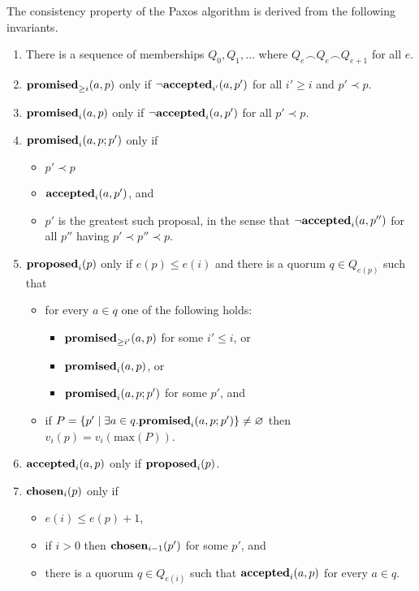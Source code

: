 \documentclass[journal]{IEEEtran}
\begin{document}
The consistency property of the Paxos algorithm is derived from the following
invariants.

\begin{enumerate}

\item\label{paxos-quorums} There is a sequence of memberships $Q_0, Q_1,
\ldots$ where ${Q_e \frown Q_e \frown Q_{e+1}}$ for all $e$.

\item\label{paxos-mprom} $\mathbf{promised}_{\ge i}(a,p)$ only if $\neg\mathbf{accepted}_{i'}(a,p')$ for all
$i' \ge i$ and $p' \prec p$.

\item\label{paxos-fprom} $\mathbf{promised}_{i}(a,p)$ only if $\neg\mathbf{accepted}_{i}(a,p')$ for all
$p' \prec p$.

\item\label{paxos-bprom} $\mathbf{promised}_{i}(a,p;p')$ only if \begin{itemize} \item
$p' \prec p$ \item $\mathbf{accepted}_{i}(a,p')$, and \item $p'$ is the greatest such
proposal, in the sense that $\neg \mathbf{accepted}_{i}(a,p'')$ for all $p''$ having $p'
\prec p'' \prec p$. \end{itemize}

\item\label{paxos-prop} $\mathbf{proposed}_{i}(p)$ only if $e(p) \le e(i)$ and there is a
quorum $q \in Q_{e(p)}$ such that
\begin{itemize}
\item for every $a \in q$ one of the following holds:
%
\begin{itemize}
\item $\mathbf{promised}_{\ge i'}(a,p)$ for some $i' \le i$, or
\item $\mathbf{promised}_{i}(a,p)$, or
\item $\mathbf{promised}_{i}(a,p;p')$ for some $p'$, and
\end{itemize}

\item if $P = \{ p' \mid \exists a \in q. \mathbf{promised}_{i}(a,p;p') \}
\ne \varnothing$ then $v_i(p) = v_i(\mathrm{max}(P))$.
\end{itemize}

\item \label{paxos-acc} $\mathbf{accepted}_{i}(a,p)$ only if $\mathbf{proposed}_{i}(p)$.

\item \label{paxos-chosen} $\mathbf{chosen}_{i}(p)$ only if
\begin{itemize}
\item $e(i) \le e(p) + 1$,
\item if $i > 0$ then $\mathbf{chosen}_{i-1}(p')$ for some $p'$, and
\item there is a quorum $q \in
Q_{e(i)}$ such that $\mathbf{accepted}_{i}(a,p)$ for every $a \in q$.
\end{itemize}

\end{enumerate}
\end{document}
